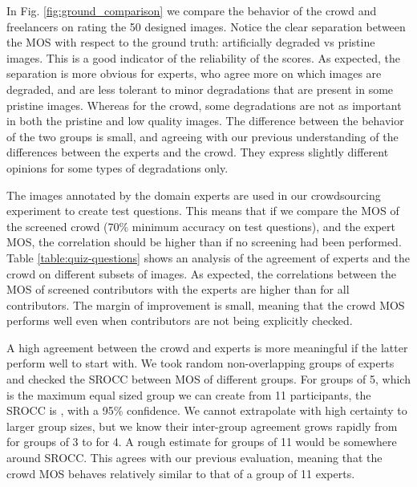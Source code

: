 \documentclass{article}
\begin{document}
In Fig. \ref{fig:ground_comparison} we compare the behavior of the crowd and freelancers on rating the 50 designed images. Notice the clear separation between the MOS with respect to the ground truth: artificially degraded vs pristine images. This is a good indicator of the reliability of the scores. As expected, the separation is more obvious for experts, who agree more on which images are degraded, and are less tolerant to minor degradations that are present in some pristine images. Whereas for the crowd, some degradations are not as important in both the pristine and low quality images. The difference between the behavior of the two groups is small, and agreeing with our previous understanding of the differences between the experts and the crowd. They express slightly different opinions for some types of degradations only.



The images annotated by the domain experts are used in our crowdsourcing experiment to create test questions. This means that if we compare the MOS of the screened crowd (70\% minimum accuracy on test questions), and the expert MOS, the correlation should be higher than if no screening had been performed. Table \ref{table:quiz-questions} shows an analysis of the agreement of experts and the crowd on different subsets of images.
As expected, the correlations between the MOS of screened contributors with the experts are higher than for all contributors. The margin of improvement is small, meaning that the crowd MOS performs well even when contributors are not being explicitly checked.

A high agreement between the crowd and experts is more meaningful if the latter perform well to start with. We took random non-overlapping groups of experts and checked the SROCC between MOS of different groups. For groups of 5, which is the maximum equal sized group we can create from 11 participants, the SROCC is , with a 95\% confidence. We cannot extrapolate with high certainty to larger group sizes, but we know their inter-group agreement grows rapidly from  for groups of 3 to  for 4. A rough estimate for groups of 11 would be somewhere around  SROCC. This agrees with our previous evaluation, meaning that the crowd MOS behaves relatively similar to that of a group of 11 experts.
\end{document}
